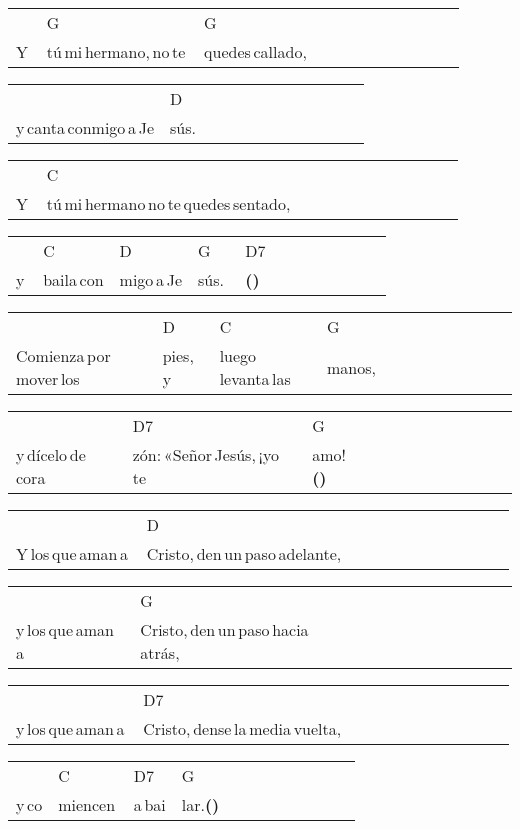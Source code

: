\begin{multicols}{2}
\begin{minipage}{\columnwidth}
\noindent
\begin{tabular}{llllllllllll}
&G&G\\
Y\,&tú\,mi\,hermano,\,no\,te\,&quedes\,callado,
\end{tabular}

\noindent
\begin{tabular}{llllllllllll}
&D\\
y\,canta\,conmigo\,a\,Je&sús.
\end{tabular}

\noindent
\begin{tabular}{llllllllllll}
&C\\
Y\,&tú\,mi\,hermano\,no\,te\,quedes\,sentado,
\end{tabular}

\noindent
\begin{tabular}{llllllllllll}
&C&D&G&D7\\
y\,&baila\,con&migo\,a\,Je&sús.\,\,&\textbf{(\texttimes2)}\\\hline
\end{tabular}

\noindent
\begin{tabular}{llllllllllll}
&D&C&G\\
Comienza\,por\,mover\,los\,&pies,\,y\,&luego\,levanta\,las\,&manos,
\end{tabular}

\noindent
\begin{tabular}{llllllllllll}
&D7&G\\
y\,dícelo\,de\,cora&zón:\,«Señor\,Jesús,\,¡yo\,te\,&amo!\textbf{(\texttimes2)}\\\hline
\end{tabular}

\noindent
\begin{tabular}{llllllllllll}
&D\\
Y\,los\,que\,aman\,a\,&Cristo,\,den\,un\,paso\,adelante,
\end{tabular}

\noindent
\begin{tabular}{llllllllllll}
&G\\
y\,los\,que\,aman\,a\,&Cristo,\,den\,un\,paso\,hacia\,atrás,
\end{tabular}

\noindent
\begin{tabular}{llllllllllll}
&D7\\
y\,los\,que\,aman\,a\,&Cristo,\,dense\,la\,media\,vuelta,
\end{tabular}

\noindent
\begin{tabular}{llllllllllll}
&C&D7&G\\
y\,co&miencen\,&a\,bai&lar.\textbf{(\texttimes2)}\\\hline
\end{tabular}
\end{minipage}\\


\end{multicols}

